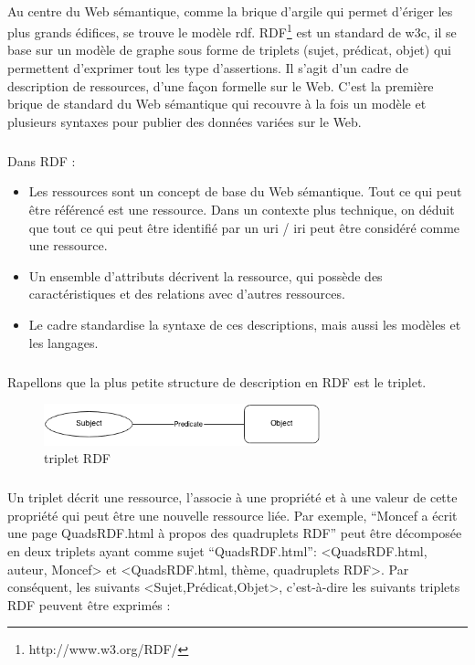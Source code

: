 \documentclass[12pt,a4]{report}
\begin{document}
\paragraph{}
Au centre du Web sémantique, comme la brique d’argile qui permet d’ériger les plus grands édifices, se trouve le modèle \gls{rdf}. RDF\footnote{http://www.w3.org/RDF/} est un standard de \gls{w3c}, il se base sur un modèle de graphe sous forme de triplets (sujet, prédicat, objet) qui permettent d'exprimer tout les type d'assertions. Il s’agit d’un cadre de description de ressources, d’une façon formelle sur le Web.
C’est la première brique de standard du Web sémantique qui recouvre à la fois un modèle et plusieurs syntaxes pour publier des données variées sur le Web.
\subparagraph{}
Dans RDF :
\newline
\begin{itemize}
\item Les ressources sont un concept de base du Web sémantique. Tout ce qui peut être référencé est une ressource. Dans un contexte plus technique, on déduit que tout ce qui peut être identifié par un \gls{uri} / \gls{iri} peut être considéré comme une ressource.
\item Un ensemble d’attributs décrivent la ressource, qui possède des caractéristiques et des relations avec d’autres ressources.
\item Le cadre standardise la syntaxe de ces descriptions, mais aussi les modèles et les langages.
\end{itemize}
\subparagraph{}
Rapellons que la plus petite structure de description en RDF est le triplet.
\begin{figure}[H]
\centering
\includegraphics[width=8cm]{tripletrdf.png}
\caption{triplet RDF}
\end{figure}
\subparagraph{}
Un triplet décrit une ressource, l’associe à une propriété et à une valeur de cette propriété qui peut être une nouvelle ressource liée. 
\newline
Par exemple, “Moncef a écrit une page QuadsRDF.html à propos des quadruplets RDF” peut être décomposée en deux triplets ayant comme sujet “QuadsRDF.html”: <QuadsRDF.html, auteur, Moncef> et <QuadsRDF.html, thème, quadruplets RDF>.
\newline
Par conséquent, les suivants <Sujet,Prédicat,Objet>, c'est-à-dire les suivants triplets RDF peuvent être exprimés :
\end{document}
